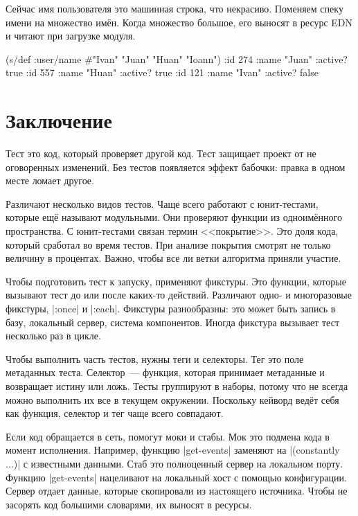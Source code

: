 Сейчас имя пользователя это машинная строка, что некрасиво. Поменяем спеку имени
на множество им\"{е}н. Когда множество большое, его выносят в ресурс EDN и
читают при загрузке модуля.

\begin{english}
  \begin{clojure}
(s/def :user/name #{"Ivan" "Juan" "Huan" "Ioann"})
{:id 274 :name "Juan" :active? true}
{:id 557 :name "Huan" :active? true}
{:id 121 :name "Ivan" :active? false}
  \end{clojure}
\end{english}

\section{Заключение}

Тест это код, который проверяет другой код. Тест защищает проект от не
оговоренных изменений. Без тестов появляется эффект бабочки: правка в одном
месте ломает другое.


Различают несколько видов тестов. Чаще всего работают с юнит-тестами, которые
ещ\"{е} называют модульными. Они проверяют функции из одноим\"{е}нного пространства. С
юнит-тестами связан термин <<покрытие>>. Это доля кода, который сработал во
время тестов. При анализе покрытия смотрят не только величину в
процентах. Важно, чтобы все ли ветки алгоритма приняли участие.

Чтобы подготовить тест к запуску, применяют фикстуры. Это функции, которые
вызывают тест до или после каких-то действий. Различают одно- и многоразовые
фикстуры, \spverb|:once| и \spverb|:each|. Фикстуры разнообразны: это может быть
запись в базу, локальный сервер, система компонентов. Иногда фикстура вызывает
тест несколько раз в цикле.

Чтобы выполнить часть тестов, нужны теги и селекторы. Тег это поле метаданных
теста. Селектор~--- функция, которая принимает метаданные и возвращает истину
или ложь. Тесты группируют в наборы, потому что не всегда можно выполнить их все
в текущем окружении. Поскольку кейворд вед\"{е}т себя как функция, селектор и
тег чаще всего совпадают.

Если код обращается в сеть, помогут моки и стабы. Мок это подмена кода в момент
исполнения. Например, функцию \spverb|get-events| заменяют на
\spverb|(constantly {...})| с известными данными. Стаб это полноценный сервер на
локальном порту. Функцию \spverb|get-events| нацеливают на локальный хост с
помощью конфигурации. Сервер отдает данные, которые скопировали из настоящего
источника. Чтобы не засорять код большими словарями, их выносят в ресурсы.

